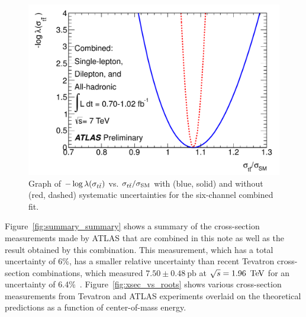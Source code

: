 \begin{figure}[ht!]
  \begin{center}
    \includegraphics[width=.7\textwidth]{figures/comb/fullcombined_likelihood_curve}
    \caption{Graph of $-\log\lambda(\sigma_{t\bar{t}})$ vs. $\sigma_{t\bar{t}}/\sigma_{\rm SM}$ with (blue, solid) and without (red, dashed) systematic uncertainties for the six-channel combined fit.}
    \label{fig:fullcombined_likelihood_curve}
  \end{center}
\end{figure}



Figure~\ref{fig:summary_summary} shows a summary of the cross-section measurements made by ATLAS that are combined in this note as well as the result obtained by this combination.
This measurement, which has a total uncertainty of 6\%, has a smaller relative uncertainty than recent Tevatron cross-section combinations, which measured $7.50 \pm 0.48~\textrm{pb}$ at $\sqrt{s}= 1.96\, \TeV$ for an uncertainty of 6.4\%~\cite{CDFCombination}.
Figure~\ref{fig:xsec_vs_roots} shows various cross-section measurements from Tevatron and ATLAS experiments overlaid on the theoretical predictions as a function of center-of-mass energy.

